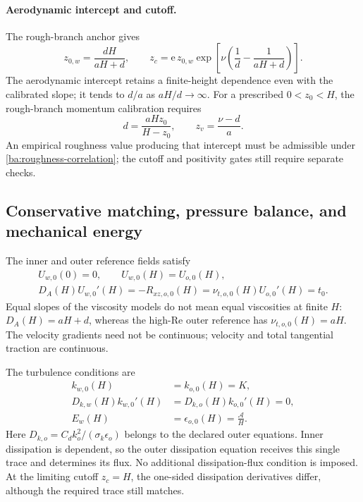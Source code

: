 \documentclass[11pt,a4paper]{article}
\numberwithin{equation}{section}
\begin{document}
\paragraph{Aerodynamic intercept and cutoff.}
The rough-branch anchor gives
\begin{equation}
 \boxed{z_{0,w}=\frac{dH}{aH+d},\qquad
 z_c=\mathrm e\,z_{0,w}
 \exp\!\left[\nu\left(\frac1d-\frac1{aH+d}\right)\right].}
 \label{ba:roughness-cutoff}
\end{equation}
The aerodynamic intercept retains a finite-height dependence even with
the calibrated slope; it tends to $d/a$ as $aH/d\to\infty$.
For a prescribed $0<z_0<H$, the rough-branch momentum calibration requires
\begin{equation}
 d=\frac{aHz_0}{H-z_0},\qquad z_v=\frac{\nu-d}{a}.
 \label{ba:inverse-intercept}
\end{equation}
An empirical roughness value producing that intercept must be admissible
under \eqref{ba:roughness-correlation}; the cutoff and positivity gates
still require separate checks.

\subsection{Conservative matching, pressure balance, and mechanical energy}
\label{ba:matching}

The inner and outer reference fields satisfy
\begin{equation}
 \begin{gathered}
 U_{w,0}(0)=0,\qquad U_{w,0}(H)=U_{o,0}(H),\\
 D_A(H)U_{w,0}'(H)
 =-R_{xz,o,0}(H)
 =\nu_{t,o,0}(H)U_{o,0}'(H)=t_0.
 \end{gathered}
 \label{ba:momentum-match}
\end{equation}
Equal slopes of the viscosity models do not mean equal viscosities at
finite $H$: $D_A(H)=aH+d$, whereas the high-Re outer reference has
$\nu_{t,o,0}(H)=aH$. The velocity gradients need not be continuous;
velocity and total tangential traction are continuous.

The turbulence conditions are
\begin{equation}
 \boxed{\begin{aligned}
 k_{w,0}(H)&=k_{o,0}(H)=K,\\
 D_{k,w}(H)k_{w,0}'(H)&=D_{k,o}(H)k_{o,0}'(H)=0,\\
 E_w(H)&=\epsilon_{o,0}(H)=\frac{\mathcal A}{H}.
 \end{aligned}}
 \label{ba:turbulence-match}
\end{equation}
Here $D_{k,o}=C_dk_o^2/(\sigma_k\epsilon_o)$ belongs to the declared
outer equations. Inner dissipation is dependent, so the outer
dissipation equation receives this single trace and determines its flux.
No additional dissipation-flux condition is imposed. At the limiting
cutoff $z_c=H$, the one-sided dissipation derivatives differ, although the
required trace still matches.
\end{document}
